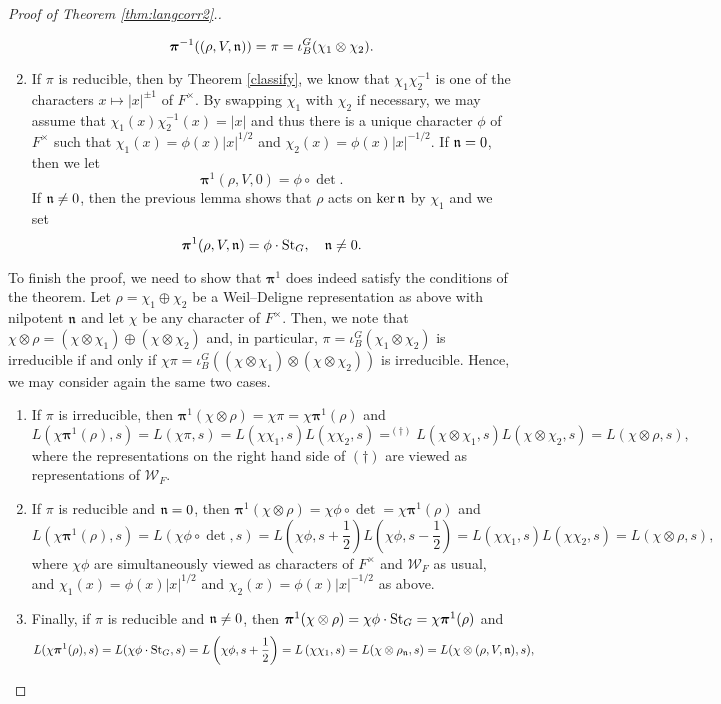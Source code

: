 \begin{proof}[Proof of Theorem \ref{thm:langcorr2}.]
\begin{enumerate}[(1)]
        $$\bm\pi^{-1}((\rho,V,\mathfrak{n}))=\pi=\iota_B^G(\chi_1\otimes\chi_2).$$
        \item If $\pi$ is reducible, then by Theorem \ref{classify}, we know that $\chi_1\chi_2^{-1}$ is one of the characters $x\mapsto|x|^{\pm1}$ of $F^\times$. By swapping $\chi_1$ with $\chi_2$ if necessary, we may assume that $\chi_1(x)\chi_2^{-1}(x)=|x|$ and thus there is a unique character $\phi$ of $F^\times$ such that $\chi_1(x)=\phi(x)|x|^{1/2}$ and $\chi_2(x)=\phi(x)|x|^{-1/2}$. If $\mathfrak{n}=0$, then we let 
        $$\bm\pi^1(\rho,V,0)=\phi\circ\det.$$
        If $\mathfrak{n}\neq0$, then the previous lemma shows that $\rho$ acts on $\ker\mathfrak{n}$ by $\chi_1$ and we set 
        $$\bm\pi^1(\rho,V,\mathfrak{n})=\phi\cdot\mathrm{St}_G,\quad \mathfrak{n}\neq0.$$
    \end{enumerate}
    To finish the proof, we need to show that $\bm\pi^1$ does indeed satisfy the conditions of the theorem. Let $\rho=\chi_1\oplus\chi_2$ be a Weil--Deligne representation as above with nilpotent $\mathfrak{n}$ and let $\chi$ be any character of $F^\times$. Then, we note that $\chi\otimes\rho=(\chi\otimes\chi_1)\oplus(\chi\otimes\chi_2)$ and, in particular, $\pi=\iota_B^G(\chi_1\otimes\chi_2)$ is irreducible if and only if $\chi\pi=\iota_B^G((\chi\otimes\chi_1)\otimes(\chi\otimes\chi_2))$ is irreducible. Hence, we may consider again the same two cases.
    \begin{enumerate}[(1)]
        \item If $\pi$ is irreducible, then $\bm\pi^1(\chi\otimes\rho)=\chi\pi=\chi\bm\pi^1(\rho)$ and
        $$L(\chi\bm\pi^1(\rho),s)=L(\chi\pi,s)=L(\chi\chi_1,s)L(\chi\chi_2,s)=^{(\dagger)}L(\chi\otimes\chi_1,s)L(\chi\otimes\chi_2,s)=L(\chi\otimes\rho,s),$$
        where the representations on the right hand side of $(\dagger)$ are viewed as representations of $\mathcal{W}_F$.
        \item If $\pi$ is reducible and $\mathfrak{n}=0$, then $\bm\pi^1(\chi\otimes\rho)=\chi\phi\circ\det=\chi\bm\pi^1(\rho)$ and
        $$L(\chi\bm\pi^1(\rho),s)=L(\chi\phi\circ\det,s)=L\left(\chi\phi,s+\frac{1}{2}\right)L\left(\chi\phi,s-\frac{1}{2}\right)=L\left(\chi\chi_1,s\right)L\left(\chi\chi_2,s\right)=L(\chi\otimes\rho,s),$$
        where $\chi\phi$ are simultaneously viewed as characters of $F^\times$ and $\mathcal{W}_F$ as usual, and $\chi_1(x)=\phi(x)|x|^{1/2}$ and $\chi_2(x)=\phi(x)|x|^{-1/2}$ as above.
        \item Finally, if $\pi$ is reducible and $\mathfrak{n}\neq0$, then $\bm\pi^1(\chi\otimes\rho)=\chi\phi\cdot\mathrm{St}_G=\chi\bm\pi^1(\rho)$ and
        $$L(\chi\bm\pi^1(\rho),s)=L(\chi\phi\cdot\mathrm{St}_G,s)=L\left(\chi\phi,s+\frac{1}{2}\right)=L\left(\chi\chi_1,s\right)=L(\chi\otimes\rho_{\mathfrak{n}},s)=L(\chi\otimes(\rho,V,\mathfrak{n}),s),$$

\end{enumerate}
\end{proof}
